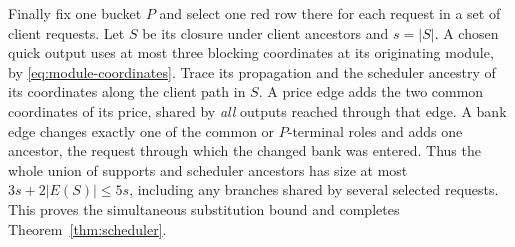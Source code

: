 Finally fix one bucket \(P\) and select one red row there for each request in a
set of client requests. Let \(S\) be its closure under client ancestors and
\(s=|S|\). A chosen quick output uses at most three blocking coordinates at its
originating module, by \eqref{eq:module-coordinates}. Trace its propagation and
the scheduler ancestry of its coordinates along the client path in \(S\).
A price edge adds the two common coordinates of its price, shared by \emph{all}
outputs reached through that edge. A bank edge changes exactly one of the
common or \(P\)-terminal roles and adds one ancestor, the request through which
the changed bank was entered. Thus the whole union of supports and scheduler
ancestors has size at most \(3s+2|E(S)|\le5s\), including any branches shared
by several selected requests. This proves the simultaneous substitution bound
and completes Theorem~\ref{thm:scheduler}.
